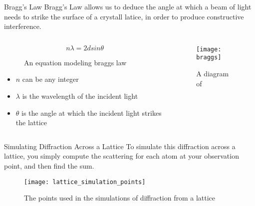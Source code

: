 \documentclass[aspectratio=169]{beamer}
\begin{document}
\begin{frame}{Bragg's Law}
	Bragg's Law allows us to deduce the angle at which a beam of light needs to strike the surface of a crystall latice, in order to produce constructive interference.
	\begin{columns}
		\begin{column}{.3\textwidth}
			\begin{figure}
			$$ n \lambda = 2d sin \theta$$
			\caption{An equation modeling braggs law}
			\end{figure}
			
			\begin{tiny}
				\begin{itemize}
					\item $n$ can be any integer
					\item $\lambda$ is the wavelength of the incident light
					\item $\theta$ is the angle at which the incident light strikes the lattice 
				\end{itemize}
			\end{tiny}
		\end{column}
		
	\begin{column}{.7\textwidth}
	\begin{figure}
		\texttt{[image: braggs]}
		\caption{A diagram of }
	\end{figure}
	\end{column}
	
	\end{columns}
\end{frame}

\begin{frame}{Simulating Diffraction Across a Lattice}
	To simulate this diffraction across a lattice, you simply compute the scattering for each atom at your observation point, and then find the sum.
	
	\begin{figure}
		\texttt{[image: lattice\_simulation\_points]}
		\caption{The points used in the simulations of diffraction from a lattice}
	\end{figure}
	
\end{frame}
\end{document}
